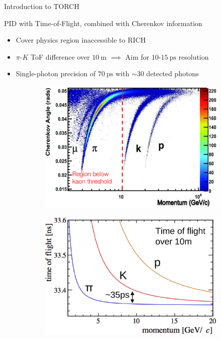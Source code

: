 \documentclass[xcolor={dvipsnames}]{beamer}
\begin{document}
\begin{frame}{Introduction to TORCH}
  \vspace{0.0cm}
  \begin{center}
    {\large PID with Time-of-Flight, combined with Cherenkov information}
  \end{center}
  \begin{itemize}
    \item{Cover physics region inaccessible to RICH}
    \item{$\pi$-$K$ ToF difference over $\SI{10}{\meter}$ $\implies$ Aim for $10$-$\SI{15}{\pico\second}$ resolution}
    \item{Single-photon precision of $\SI{70}{\pico\second}$ with $\sim 30$ detected photons}
  \end{itemize}
  \begin{figure}
    \centering
    \begin{subfigure}{0.5\textwidth}
      \centering
      \includegraphics[width = 1.0\textwidth]{Figs/RICH_CherenkovAngle.png}
    \end{subfigure}%
    \begin{subfigure}{0.5\textwidth}
      \centering
      \includegraphics[width = 1.0\textwidth]{Figs/TORCH_ToF.png}
    \end{subfigure}
  \end{figure}
\end{frame}
\end{document}
